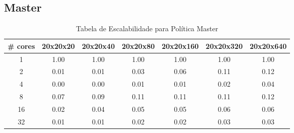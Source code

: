\documentclass[a4paper, 12pt]{article}
\begin{document}
	\subsection{Master}
	\begin{table}[h!]
		\centering
		\begin{tabular}{|c|c|c|c|c|c|c|}
			\hline
			\textbf{\# cores} & \textbf{20x20x20} & \textbf{20x20x40} & \textbf{20x20x80} & \textbf{20x20x160} & \textbf{20x20x320} & \textbf{20x20x640} \\ \hline
			1                 & 1.00              & 1.00              & 1.00              & 1.00               & 1.00               & 1.00               \\ \hline
			2                 & 0.01              & 0.01              & 0.03              & 0.06               & 0.11               & 0.12               \\ \hline
			4                 & 0.00              & 0.00              & 0.01              & 0.01               & 0.02               & 0.04               \\ \hline
			8                 & 0.07              & 0.09              & 0.11              & 0.11               & 0.11               & 0.12               \\ \hline
			16                & 0.02              & 0.04              & 0.05              & 0.05               & 0.06               & 0.06               \\ \hline
			32                & 0.01              & 0.01              & 0.02              & 0.02               & 0.03               & 0.03               \\ \hline
		\end{tabular}
		\caption{Tabela de Escalabilidade para Política Master}
		\label{tab:Tabela de Escalabilidade para Política Master} %
	\end{table}
	
	\vspace{5cm}
	
	\FloatBarrier
	
\end{document}
